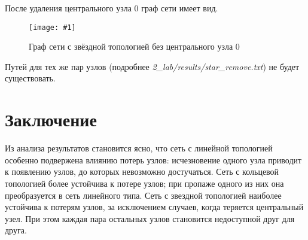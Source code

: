 \documentclass[a4paper,12pt]{article}
\newcommand{\plot}[3]{
    \begin{figure}[H]
        \begin{center}
            \texttt{[image: \#1]}
            \caption{#2}
            \label{#3}
        \end{center}
    \end{figure}
}
\begin{document}
    После удаления центрального узла $ 0 $ граф сети имеет вид.
    \plot{rm_star}{Граф сети с звёздной топологией без центрального узла $ 0 $}{p:rmStar}

    Путей для тех же пар узлов (подробнее \textsl{2\_lab/results/star\_remove.txt})
    не будет существовать.

    \section{Заключение}\label{sec:4}
    Из анализа результатов становится ясно, что сеть с линейной топологией особенно подвержена влиянию потерь узлов: исчезновение одного узла приводит к появлению узлов, до которых невозможно достучаться.
    Сеть с кольцевой топологией более устойчива к потере узлов; при пропаже одного из них она преобразуется в сеть линейного типа. Сеть с звездной топологией наиболее устойчива к потерям узлов, за исключением случаев, когда теряется центральный узел. При этом каждая пара остальных узлов становится недоступной друг для друга.
\end{document}
